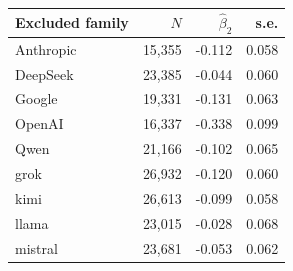 \begin{tabular}{lrrr}
\toprule
Excluded family & $N$ & $\widehat\beta_2$ & s.e. \\
\midrule
Anthropic & 15,355 & -0.112 & 0.058 \\
DeepSeek & 23,385 & -0.044 & 0.060 \\
Google & 19,331 & -0.131 & 0.063 \\
OpenAI & 16,337 & -0.338 & 0.099 \\
Qwen & 21,166 & -0.102 & 0.065 \\
grok & 26,932 & -0.120 & 0.060 \\
kimi & 26,613 & -0.099 & 0.058 \\
llama & 23,015 & -0.028 & 0.068 \\
mistral & 23,681 & -0.053 & 0.062 \\
\bottomrule
\end{tabular}
